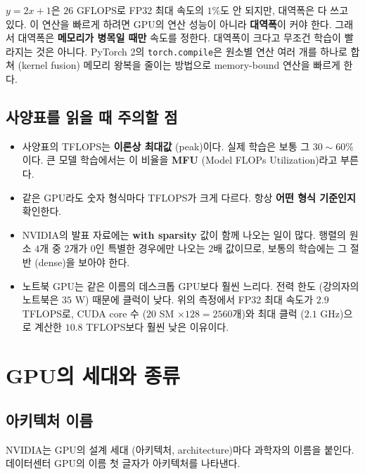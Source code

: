 \documentclass[11pt,a4paper]{article}
\begin{document}
$y=2x+1$은 $26$ GFLOPS로 FP32 최대 속도의 $1\%$도 안 되지만, 대역폭은 다 쓰고 있다. 이 연산을 빠르게 하려면 GPU의 연산 성능이 아니라 \textbf{대역폭}이 커야 한다.
그래서 대역폭은 \textbf{메모리가 병목일 때만} 속도를 정한다. 대역폭이 크다고 무조건 학습이 빨라지는 것은 아니다.
PyTorch 2의 \texttt{torch.compile}은 원소별 연산 여러 개를 하나로 합쳐 (kernel fusion) 메모리 왕복을 줄이는 방법으로 memory-bound 연산을 빠르게 한다.

\subsection{사양표를 읽을 때 주의할 점}\label{sec:spec_reading}

\begin{itemize}[leftmargin=1.5em]
\item 사양표의 TFLOPS는 \textbf{이론상 최대값} (peak)이다. 실제 학습은 보통 그 $30\sim60\%$이다.
큰 모델 학습에서는 이 비율을 \textbf{MFU} (Model FLOPs Utilization)라고 부른다.
\item 같은 GPU라도 숫자 형식마다 TFLOPS가 크게 다르다. 항상 \textbf{어떤 형식 기준인지} 확인한다.
\item NVIDIA의 발표 자료에는 \textbf{with sparsity} 값이 함께 나오는 일이 많다. 행렬의 원소 $4$개 중 $2$개가 $0$인 특별한 경우에만 나오는 $2$배 값이므로, 보통의 학습에는 그 절반 (dense)을 보아야 한다.
\item 노트북 GPU는 같은 이름의 데스크톱 GPU보다 훨씬 느리다. 전력 한도 (강의자의 노트북은 $35$ W) 때문에 클럭이 낮다.
위의 측정에서 FP32 최대 속도가 $2.9$ TFLOPS로, CUDA core 수 ($20$ SM $\times128=2560$개)와 최대 클럭 ($2.1$ GHz)으로 계산한 $10.8$ TFLOPS보다 훨씬 낮은 이유이다.
\end{itemize}

\section{GPU의 세대와 종류}\label{sec:generations}

\subsection{아키텍처 이름}\label{sec:arch_names}

NVIDIA는 GPU의 설계 세대 (아키텍처, architecture)마다 과학자의 이름을 붙인다. 데이터센터 GPU의 이름 첫 글자가 아키텍처를 나타낸다.
\end{document}
